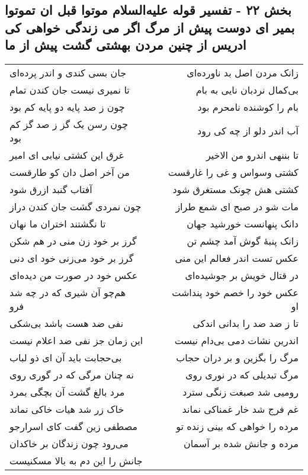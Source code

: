 \begin{center}
\section*{بخش ۲۲ - تفسیر قوله علیه‌السلام موتوا قبل ان تموتوا بمیر ای دوست پیش از مرگ اگر می زندگی خواهی کی ادریس از چنین مردن بهشتی گشت پیش از ما}
\label{sec:sh022}
\begin{longtable}{l p{0.5cm} r}
جان بسی کندی و اندر پرده‌ای
&&
زانک مردن اصل بد ناورده‌ای
\\
تا نمیری نیست جان کندن تمام
&&
بی‌کمال نردبان نایی به بام
\\
چون ز صد پایه دو پایه کم بود
&&
بام را کوشنده نامحرم بود
\\
چون رسن یک گز ز صد گز کم بود
&&
آب اندر دلو از چه کی رود
\\
غرق این کشتی نیابی ای امیر
&&
تا بننهی اندرو من الاخیر
\\
من آخر اصل دان کو طارقست
&&
کشتی وسواس و غی را غارقست
\\
آفتاب گنبد ازرق شود
&&
کشتی هش چونک مستغرق شود
\\
چون نمردی گشت جان کندن دراز
&&
مات شو در صبح ای شمع طراز
\\
تا نگشتند اختران ما نهان
&&
دانک پنهانست خورشید جهان
\\
گرز بر خود زن منی در هم شکن
&&
زانک پنبهٔ گوش آمد چشم تن
\\
گرز بر خود می‌زنی خود ای دنی
&&
عکس تست اندر فعالم این منی
\\
عکس خود در صورت من دیده‌ای
&&
در قتال خویش بر جوشیده‌ای
\\
هم‌چو آن شیری که در چه شد فرو
&&
عکس خود را خصم خود پنداشت او
\\
نفی ضد هست باشد بی‌شکی
&&
تا ز ضد ضد را بدانی اندکی
\\
این زمان جز نفی ضد اعلام نیست
&&
اندرین نشات دمی بی‌دام نیست
\\
بی‌حجابت باید آن ای ذو لباب
&&
مرگ را بگزین و بر دران حجاب
\\
نه چنان مرگی که در گوری روی
&&
مرگ تبدیلی که در نوری روی
\\
مرد بالغ گشت آن بچگی بمرد
&&
رومیی شد صبغت زنگی سترد
\\
خاک زر شد هیات خاکی نماند
&&
غم فرج شد خار غمناکی نماند
\\
مصطفی زین گفت کای اسرارجو
&&
مرده را خواهی که بینی زنده تو
\\
می‌رود چون زندگان بر خاکدان
&&
مرده و جانش شده بر آسمان
\\
جانش را این دم به بالا مسکنیست

\end{longtable}
\end{center}
